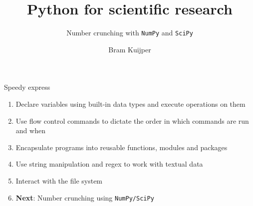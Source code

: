 \documentclass[xcolor=table]{beamer}
\title[Python for scientific research]{Python for scientific research}
\subtitle{Number crunching with \texttt{NumPy} and \texttt{SciPy}}
\author{Bram Kuijper}
\institute[]{University of Exeter, Penryn Campus, UK}
\begin{document}
\begin{frame}
\titlepage
\end{frame}

    \begin{frame}{Speedy express}

	\begin{enumerate}\addtolength{\itemsep}{.5\baselineskip}
		\item Declare variables using built-in data types and execute operations
		on them
		\item Use flow control commands to dictate the order in which commands are run
		and when
		\item Encapsulate programs into reusable functions, modules and packages
		\item Use string manipulation and regex to work with textual data
        \item Interact with the file system
		\item \textbf{Next}: Number crunching using \texttt{NumPy/SciPy}
	\end{enumerate}

\end{frame}
\end{document}
